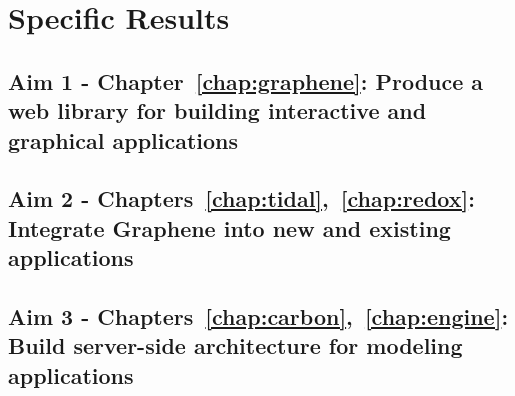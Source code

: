 \section{Specific Results}
\subsection{Aim 1 - Chapter~\ref{chap:graphene}: Produce a web library for building interactive and graphical applications}
\subsection{Aim 2 - Chapters~\ref{chap:tidal},~\ref{chap:redox}: Integrate Graphene into new and existing applications}
\subsection{Aim 3 - Chapters~\ref{chap:carbon},~\ref{chap:engine}: Build server-side architecture for modeling applications}

